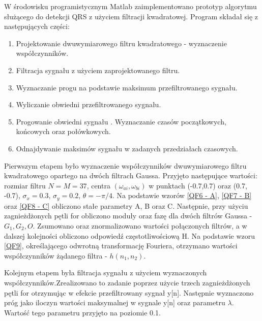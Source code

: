 \documentclass[10pt,a4paper]{article}
\begin{document}
W środowisku programistycznym Matlab zaimplementowano prototyp algorytmu służącego do detekcji QRS z użyciem filtracji kwadratowej. Program składał się z następujących części:
\begin{enumerate}
\item Projektowanie dwuwymiarowego filtru kwadratowego - wyznaczenie współczynników.
\item Filtracja sygnału z użyciem zaprojektowanego filtru.
\item Wyznaczanie progu na podstawie maksimum przefiltrowanego sygnału.
\item Wyliczanie obwiedni przefiltrowanego sygnału.
\item Progowanie obwiedni sygnału . Wyznaczanie czasów początkowych, końcowych oraz połówkowych.
\item Odnajdywanie maksimów sygnału w zadanych przedziałach czasowych.
\end{enumerate}

Pierwszym etapem było wyznaczenie współczynników dwuwymiarowego filtru kwadratowego opartego na dwóch filtrach Gaussa. Przyjęto następujące wartości: rozmiar filtru \begin{math}N=M=37\end{math}, centra \begin{math}(\omega_{ai},\omega_{bi})\end{math} w punktach (-0.7,0.7) oraz (0.7, -0.7), \begin{math}\sigma_x = 0.3\end{math}, \begin{math}\sigma_y = 0.2\end{math}, \begin{math}\theta = -\pi / 4\end{math}. Na podstawie wzorów \ref{QF6  - A}, \ref{QF7  - B} oraz \ref{QF8  - C} obliczono stałe parametry A, B oraz C. Następnie, przy użyciu zagnieżdżonych pętli for obliczono moduły oraz fazę dla dwóch filtrów Gaussa - \begin{math} G_1, G_2, O\end{math}. Zsumowano oraz znormalizowano wartości połączonych filtrów, a w dalszej kolejności obliczono odpowiedź częstotliwościową H. Na podstawie wzoru \ref{QF9}, określającego odwrotną transformację Fouriera, otrzymano wartości współczynników żądanego filtra - \begin{math} h(n_1,n_2)\end{math}.

Kolejnym etapem była filtracja sygnału z użyciem wyznaczonych współczynników.Zrealizowano to zadanie poprzez użycie trzech zagnieżdżonych pętli for otrzymując w efekcie przefiltrowany sygnał y[n]. Następnie wyznaczono próg jako iloczyn wartości maksymalnej w sygnale y[n] oraz parametru \begin{math}\lambda\end{math}. Wartość tego parametru przyjęto na poziomie 0.1.
\end{document}
